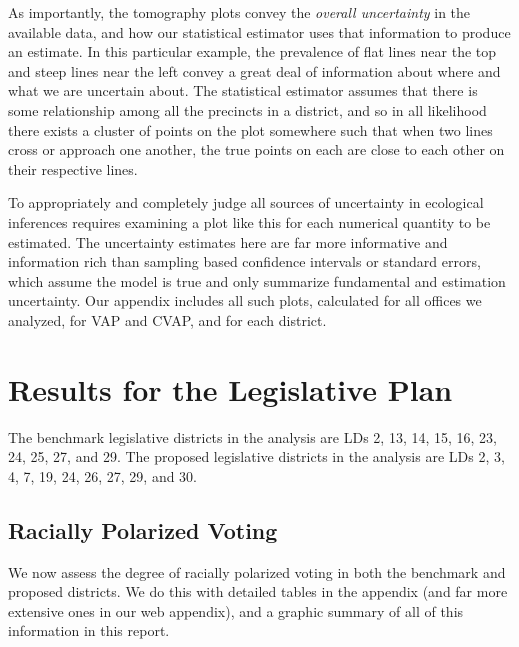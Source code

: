 \documentclass[12pt]{article}
\begin{document}
As importantly, the tomography plots convey the \emph{overall
  uncertainty} in the available data, and how our statistical
estimator uses that information to produce an estimate.  In this
particular example, the prevalence of flat lines near the top and
steep lines near the left convey a great deal of information about
where and what we are uncertain about.  The statistical estimator
assumes that there is some relationship among all the precincts in a
district, and so in all likelihood there exists a cluster of points on
the plot somewhere such that when two lines cross or approach one
another, the true points on each are close to each other on their
respective lines.  

To appropriately and completely judge all sources of uncertainty in
ecological inferences requires examining a plot like this for each
numerical quantity to be estimated.  The uncertainty estimates here
are far more informative and information rich than sampling based
confidence intervals or standard errors, which assume the model is
true and only summarize fundamental and estimation uncertainty.  Our
appendix includes all such plots, calculated for all offices we
analyzed, for VAP and CVAP, and for each district.

\section{Results for the Legislative Plan}\label{s:res}

The benchmark legislative districts in the analysis are LDs 2, 13, 14,
15, 16, 23, 24, 25, 27, and 29. The proposed legislative districts in
the analysis are LDs 2, 3, 4, 7, 19, 24, 26, 27, 29, and 30.

\subsection{Racially Polarized Voting}

We now assess the degree of racially polarized voting in both the
benchmark and proposed districts.  We do this with detailed tables in
the appendix (and far more extensive ones in our web appendix), and a
graphic summary of all of this information in this report.

\end{document}
